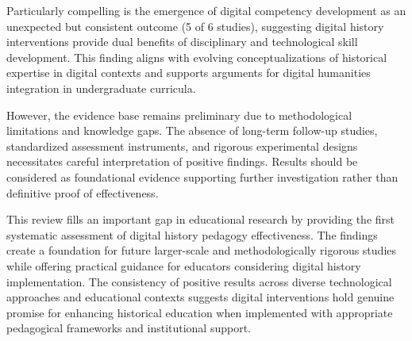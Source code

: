 \documentclass[
hf,
]{ceurart}
\begin{document}
Particularly compelling is the emergence of digital competency development as an unexpected but consistent outcome (5 of 6 studies), suggesting digital history interventions provide dual benefits of disciplinary and technological skill development. This finding aligns with evolving conceptualizations of historical expertise in digital contexts \cite{Block2021} and supports arguments for digital humanities integration in undergraduate curricula.

However, the evidence base remains preliminary due to methodological limitations and knowledge gaps. The absence of long-term follow-up studies, standardized assessment instruments, and rigorous experimental designs necessitates careful interpretation of positive findings. Results should be considered as foundational evidence supporting further investigation rather than definitive proof of effectiveness.

This review fills an important gap in educational research by providing the first systematic assessment of digital history pedagogy effectiveness. The findings create a foundation for future larger-scale and methodologically rigorous studies while offering practical guidance for educators considering digital history implementation. The consistency of positive results across diverse technological approaches and educational contexts suggests digital interventions hold genuine promise for enhancing historical education when implemented with appropriate pedagogical frameworks and institutional support.




\end{document}
